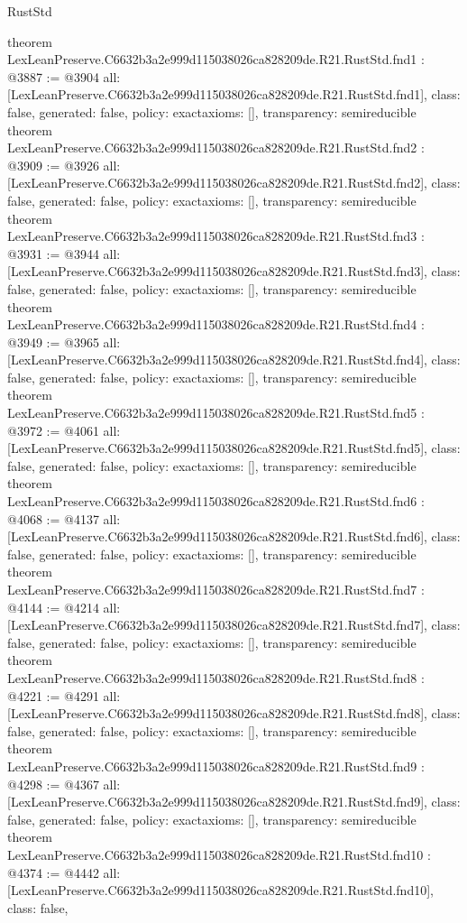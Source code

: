 \begin{lexlean}{RustStd}
\begin{coremodule}
{}
theorem LexLeanPreserve.C6632b3a2e999d115038026ca828209de.R21.RustStd.fnd1 : @3887 := @3904 {
  all: [LexLeanPreserve.C6632b3a2e999d115038026ca828209de.R21.RustStd.fnd1],
  class: false,
  generated: false,
  policy: exact{axioms: []},
  transparency: semireducible
}
theorem LexLeanPreserve.C6632b3a2e999d115038026ca828209de.R21.RustStd.fnd2 : @3909 := @3926 {
  all: [LexLeanPreserve.C6632b3a2e999d115038026ca828209de.R21.RustStd.fnd2],
  class: false,
  generated: false,
  policy: exact{axioms: []},
  transparency: semireducible
}
theorem LexLeanPreserve.C6632b3a2e999d115038026ca828209de.R21.RustStd.fnd3 : @3931 := @3944 {
  all: [LexLeanPreserve.C6632b3a2e999d115038026ca828209de.R21.RustStd.fnd3],
  class: false,
  generated: false,
  policy: exact{axioms: []},
  transparency: semireducible
}
theorem LexLeanPreserve.C6632b3a2e999d115038026ca828209de.R21.RustStd.fnd4 : @3949 := @3965 {
  all: [LexLeanPreserve.C6632b3a2e999d115038026ca828209de.R21.RustStd.fnd4],
  class: false,
  generated: false,
  policy: exact{axioms: []},
  transparency: semireducible
}
theorem LexLeanPreserve.C6632b3a2e999d115038026ca828209de.R21.RustStd.fnd5 : @3972 := @4061 {
  all: [LexLeanPreserve.C6632b3a2e999d115038026ca828209de.R21.RustStd.fnd5],
  class: false,
  generated: false,
  policy: exact{axioms: []},
  transparency: semireducible
}
theorem LexLeanPreserve.C6632b3a2e999d115038026ca828209de.R21.RustStd.fnd6 : @4068 := @4137 {
  all: [LexLeanPreserve.C6632b3a2e999d115038026ca828209de.R21.RustStd.fnd6],
  class: false,
  generated: false,
  policy: exact{axioms: []},
  transparency: semireducible
}
theorem LexLeanPreserve.C6632b3a2e999d115038026ca828209de.R21.RustStd.fnd7 : @4144 := @4214 {
  all: [LexLeanPreserve.C6632b3a2e999d115038026ca828209de.R21.RustStd.fnd7],
  class: false,
  generated: false,
  policy: exact{axioms: []},
  transparency: semireducible
}
theorem LexLeanPreserve.C6632b3a2e999d115038026ca828209de.R21.RustStd.fnd8 : @4221 := @4291 {
  all: [LexLeanPreserve.C6632b3a2e999d115038026ca828209de.R21.RustStd.fnd8],
  class: false,
  generated: false,
  policy: exact{axioms: []},
  transparency: semireducible
}
theorem LexLeanPreserve.C6632b3a2e999d115038026ca828209de.R21.RustStd.fnd9 : @4298 := @4367 {
  all: [LexLeanPreserve.C6632b3a2e999d115038026ca828209de.R21.RustStd.fnd9],
  class: false,
  generated: false,
  policy: exact{axioms: []},
  transparency: semireducible
}
theorem LexLeanPreserve.C6632b3a2e999d115038026ca828209de.R21.RustStd.fnd10 : @4374 := @4442 {
  all: [LexLeanPreserve.C6632b3a2e999d115038026ca828209de.R21.RustStd.fnd10],
  class: false,
}
\end{coremodule}
\end{lexlean}
